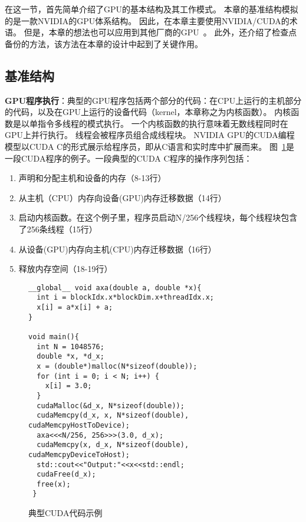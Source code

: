 在这一节，首先简单介绍了GPU的基本结构及其工作模式。
本章的基准结构模拟的是一款NVIDIA的GPU体系结构。
因此，在本章主要使用NVIDIA/CUDA的术语。
但是，本章的想法也可以应用到其他厂商的GPU~。
此外，还介绍了检查点备份的方法，该方法在本章的设计中起到了关键作用。

\subsection{基准结构}

\textbf{GPU程序执行}：典型的GPU程序包括两个部分的代码：在CPU上运行的主机部分的代码，以及在GPU上运行的设备代码（kernel，本章称之为内核函数）。
内核函数是以单指令多线程的模式执行。
一个内核函数的执行意味着无数线程同时在GPU上并行执行。
线程会被程序员组合成线程块。
NVIDIA GPU的CUDA编程模型以CUDA C的形式展示给程序员，即从C语言和实时库中扩展而来。
图~\ref{fig:cuda_code}是一段CUDA程序的例子。一段典型的CUDA C程序的操作序列包括：
\renewcommand*\theenumi{(\alph{enumi})}
\begin{enumerate}
\setlength\itemsep{1pt}
\item 声明和分配主机和设备的内存（8-13行）
\item 从主机（CPU）内存向设备(GPU)内存迁移数据（14行）
\item 启动内核函数。在这个例子里，程序员启动N/256个线程块，每个线程块包含了256条线程（15行）
\item 从设备(GPU)内存向主机(CPU)内存迁移数据（16行）
\item 释放内存空间（18-19行）
\end{enumerate}


\begin{figure}[htbp] 
  \centering
  \begin{lstlisting}[language={[ANSI]C}]
__global__ void axa(double a, double *x){
  int i = blockIdx.x*blockDim.x+threadIdx.x;
  x[i] = a*x[i] + a;
}

void main(){
  int N = 1048576;
  double *x, *d_x;
  x = (double*)malloc(N*sizeof(double));
  for (int i = 0; i < N; i++) {
  	x[i] = 3.0;
  } 
  cudaMalloc(&d_x, N*sizeof(double)); 
  cudaMemcpy(d_x, x, N*sizeof(double), cudaMemcpyHostToDevice);  
  axa<<<N/256, 256>>>(3.0, d_x);
  cudaMemcpy(x, d_x, N*sizeof(double), cudaMemcpyDeviceToHost);
  std::cout<<"Output:"<<x<<std::endl;
  cudaFree(d_x);
  free(x);
 }
  \end{lstlisting} 
\caption{典型CUDA代码示例}
\label{fig:cuda_code}
\end{figure}



